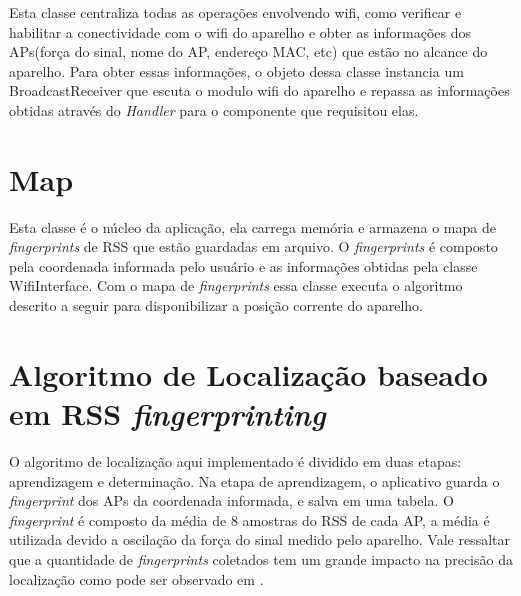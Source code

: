   Esta classe centraliza todas as operações envolvendo wifi, como verificar e habilitar a conectividade
  com o wifi do aparelho e obter as informações dos APs(força do sinal, nome do AP, endereço MAC, etc) 
  que estão no alcance do aparelho. Para obter essas informações, o objeto dessa classe
  instancia um BroadcastReceiver que escuta o modulo wifi do aparelho e repassa 
  as informações obtidas através do \textit{Handler} para o componente que requisitou elas.
  
  \section{Map}
  Esta classe é o núcleo da aplicação, ela carrega memória e armazena o mapa de \textit{fingerprints} de RSS que estão 
  guardadas em arquivo. 
  O \textit{fingerprints} é composto 
  pela coordenada informada pelo usuário e as informações obtidas pela classe WifiInterface. 
  Com o mapa de \textit{fingerprints} essa classe executa o algoritmo descrito a seguir para disponibilizar 
  a posição corrente do aparelho.
   
  \section{Algoritmo de Localização baseado em RSS \textit{fingerprinting}}
  
  O algoritmo de localização aqui implementado é dividido em duas etapas: aprendizagem e determinação. Na etapa de aprendizagem, 
  o aplicativo guarda o \textit{fingerprint} dos APs da coordenada informada,
  e salva em uma tabela. O \textit{fingerprint} é composto da média de 8 amostras do RSS de cada AP, a média é utilizada 
  devido a oscilação da força do sinal medido pelo aparelho. Vale ressaltar que a quantidade de \textit{fingerprints} coletados tem um grande 
  impacto na precisão da localização como pode ser observado em \cite{wifiRadar}.  
  
